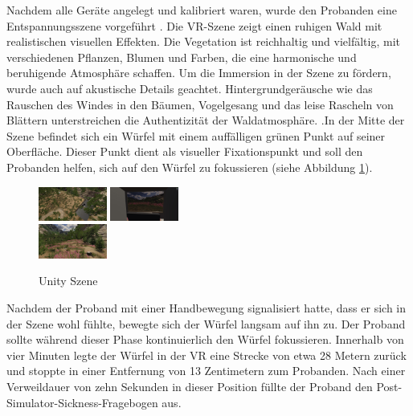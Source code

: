 \documentclass[conference]{IEEEtran}
\begin{document}
Nachdem alle Geräte angelegt und kalibriert waren, wurde den Probanden eine Entspannungsszene vorgeführt \cite{b12}. Die VR-Szene zeigt einen ruhigen Wald mit realistischen visuellen Effekten. Die Vegetation ist reichhaltig und vielfältig, mit verschiedenen Pflanzen, Blumen und Farben, die eine harmonische und beruhigende Atmosphäre schaffen. Um die Immersion in der Szene zu fördern, wurde auch auf akustische Details geachtet. Hintergrundgeräusche wie das Rauschen des Windes in den Bäumen, Vogelgesang und das leise Rascheln von Blättern unterstreichen die Authentizität der Waldatmosphäre. .In der Mitte der Szene befindet sich ein Würfel mit einem auffälligen grünen Punkt auf seiner Oberfläche. Dieser Punkt dient als visueller Fixationspunkt und soll den Probanden helfen, sich auf den Würfel zu fokussieren (siehe Abbildung \ref{fig:unity_scene}).

\begin{figure}[ht]
	\centering
	\includegraphics[width=0.2\textwidth]{assets/00.jpg} \hspace{-5pt}
	\includegraphics[width=0.2\textwidth]{assets/01.jpg} \\
	\vspace{2pt}
	\includegraphics[width=0.2\textwidth]{assets/02.jpg} \hspace{-5pt}
	\caption{Unity Szene}
	\label{fig:unity_scene}
\end{figure}

Nachdem der Proband mit einer Handbewegung signalisiert hatte, dass er sich in der Szene wohl fühlte, bewegte sich der Würfel langsam auf ihn zu. Der Proband sollte während dieser Phase kontinuierlich den Würfel fokussieren. Innerhalb von vier Minuten legte der Würfel in der VR eine Strecke von etwa 28 Metern zurück und stoppte in einer Entfernung von 13 Zentimetern zum Probanden. Nach einer Verweildauer von zehn Sekunden in dieser Position füllte der Proband den Post-Simulator-Sickness-Fragebogen aus.
\end{document}
